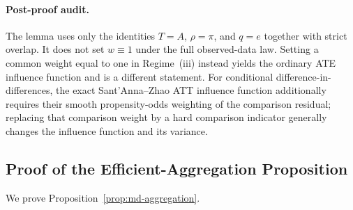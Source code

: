 \documentclass{article}
\begin{document}
\paragraph{Post-proof audit.}
The lemma uses only the identities $T=A$, $\rho=\pi$, and $q=e$ together with strict overlap. It does not set $w\equiv1$ under the full observed-data law. Setting a common weight equal to one in Regime~(iii) instead yields the ordinary ATE influence function and is a different statement. For conditional difference-in-differences, the exact Sant'Anna--Zhao ATT influence function additionally requires their smooth propensity-odds weighting of the comparison residual; replacing that comparison weight by a hard comparison indicator generally changes the influence function and its variance.

\subsection{Proof of the Efficient-Aggregation Proposition}\label{app:prop-md}

We prove Proposition~\ref{prop:md-aggregation}.
\end{document}
